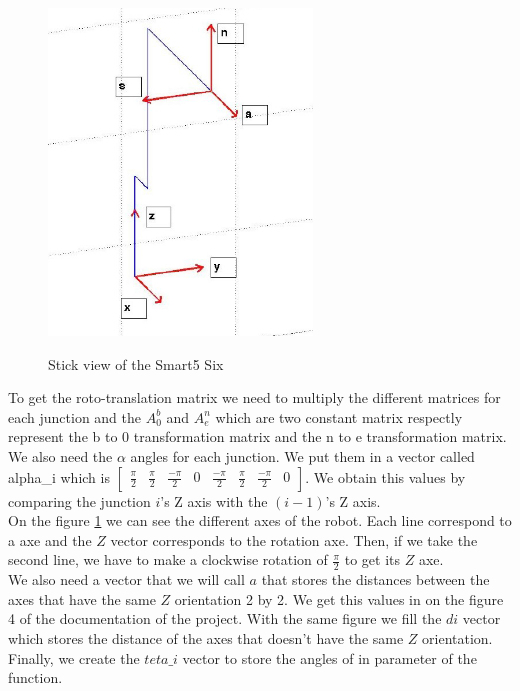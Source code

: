 \documentclass[english,a4paper,11pt]{report}
\begin{document}
	
	\begin{figure} 
		\vspace{-1cm}

 		 \begin{center}
  			\includegraphics[width=7cm]{images_not_compressed/alphaAngles.png}
			\label{alpha}
			\caption{Stick view of the Smart5 Six}
 		 \end{center}
	\end{figure} 
	
	\vspace{1cm}
	
	To get the roto-translation matrix we need to multiply the different matrices for each junction and the $A^{b}_{0}$ and $A^{n}_{e}$ which are two constant matrix respectly represent the b to 0 transformation matrix and the n to e transformation matrix.\\
	We also need the $\alpha$ angles for each junction. We put them in a vector called alpha\_i which is $\begin{bmatrix}\frac{\pi}{2} & \frac{\pi}{2} & \frac{-\pi}{2} & 0 & \frac{-\pi}{2} & \frac{\pi}{2} & \frac{-\pi}{2} & 0\end{bmatrix}$. We obtain this values by comparing the junction $i$\rq{}s Z axis with the $(i-1)$\rq{}s Z axis.\\
	On the figure \ref{alpha} we can see the different axes of the robot. Each line correspond to a axe and the $Z$ vector corresponds to the rotation axe. Then, if we take the second line, we have to make a clockwise rotation of $\frac{\pi}{2}$ to get its $Z$ axe.\\
	We also need a vector that we will call $a$ that stores the distances between the axes that have the same $Z$ orientation 2 by 2. We get this values in on the figure 4 of the documentation of the project. With the same figure we fill the $di$ vector which stores the distance of the axes that doesn\rq{}t have the same $Z$ orientation.
	Finally, we create the $teta\_i$ vector to store the angles of in parameter of the function.
	
\end{document}
